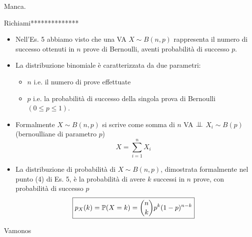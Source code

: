 \Soluzione

Manca.

\Soluzione

Richiami**************
\begin{itemize}
\item Nell'Es. 5 abbiamo visto che una VA $X\sim B(n,p)$ rappresenta il numero di successo ottenuti in $n$ prove di Bernoulli, aventi probabilità di successo $p$.
\item La distribuzione binomiale è caratterizzata da due parametri:
\begin{itemize}
\item $n$ i.e. il numero di prove effettuate
\item $p$ i.e. la probabilità di successo della singola prova di Bernoulli $(0\leq p\leq 1)$.
\end{itemize}
\item Formalmente $X\sim B(n,p)$ si scrive come somma di $n$ VA $\perp \!\!\! \perp $ $X_{i} \sim B(p)$ (bernoulliane di parametro $p$)\begin{equation*}
X=\sum\limits _{i=1}^{n} X_{i}
\end{equation*}
\item La distribuzione di probabilità di $X\sim B(n,p)$, dimostrata formalmente nel punto (4) di Es. 5, è la probabilità di avere $k$ successi in $n$ prove, con probabilità di successo $p$
\begin{equation*}
\boxed{p_{X}(k) =\mathbb{P}(X=k) =\binom{n}{k} p^{k}(1-p)^{n-k}}
\end{equation*}
\end{itemize}

Vamonos

